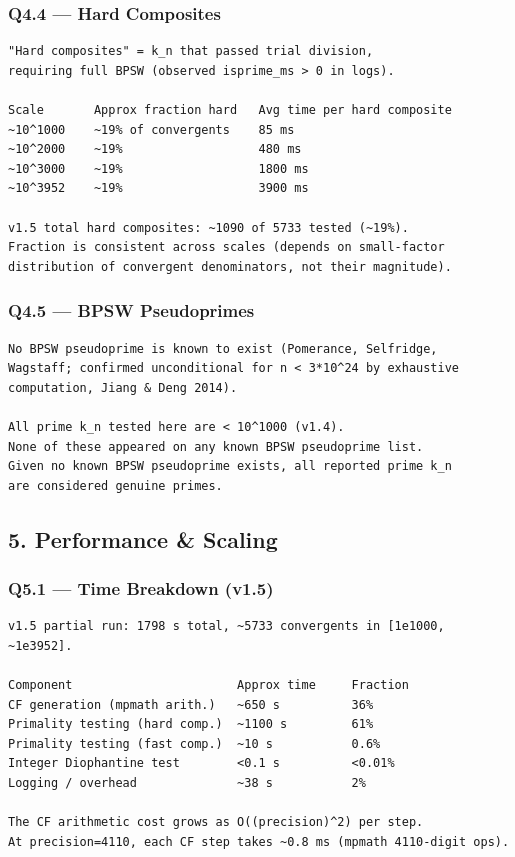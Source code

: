 \documentclass[11pt,a4paper]{article}
\begin{document}
\subsubsection*{Q4.4 --- Hard Composites}

\begin{lstlisting}
"Hard composites" = k_n that passed trial division,
requiring full BPSW (observed isprime_ms > 0 in logs).

Scale       Approx fraction hard   Avg time per hard composite
~10^1000    ~19% of convergents    85 ms
~10^2000    ~19%                   480 ms
~10^3000    ~19%                   1800 ms
~10^3952    ~19%                   3900 ms

v1.5 total hard composites: ~1090 of 5733 tested (~19%).
Fraction is consistent across scales (depends on small-factor
distribution of convergent denominators, not their magnitude).
\end{lstlisting}

\subsubsection*{Q4.5 --- BPSW Pseudoprimes}

\begin{lstlisting}
No BPSW pseudoprime is known to exist (Pomerance, Selfridge,
Wagstaff; confirmed unconditional for n < 3*10^24 by exhaustive
computation, Jiang & Deng 2014).

All prime k_n tested here are < 10^1000 (v1.4).
None of these appeared on any known BPSW pseudoprime list.
Given no known BPSW pseudoprime exists, all reported prime k_n
are considered genuine primes.
\end{lstlisting}

\subsection{5. Performance \& Scaling}

\subsubsection*{Q5.1 --- Time Breakdown (v1.5)}

\begin{lstlisting}
v1.5 partial run: 1798 s total, ~5733 convergents in [1e1000, ~1e3952].

Component                       Approx time     Fraction
CF generation (mpmath arith.)   ~650 s          36%
Primality testing (hard comp.)  ~1100 s         61%
Primality testing (fast comp.)  ~10 s           0.6%
Integer Diophantine test        <0.1 s          <0.01%
Logging / overhead              ~38 s           2%

The CF arithmetic cost grows as O((precision)^2) per step.
At precision=4110, each CF step takes ~0.8 ms (mpmath 4110-digit ops).
\end{lstlisting}
\end{document}
